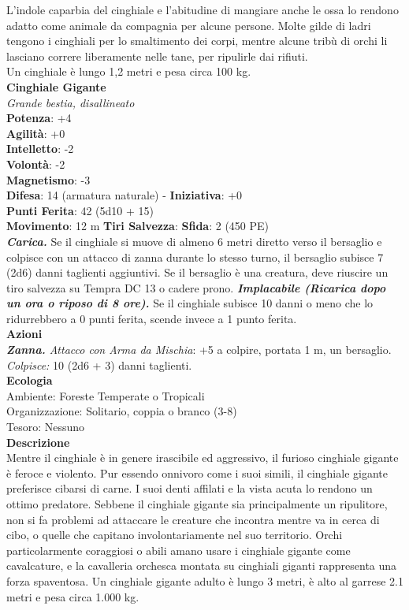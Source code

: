 \begin{multicols}{2}
L'indole caparbia del cinghiale e l'abitudine di mangiare anche le ossa lo rendono adatto come animale da compagnia per alcune persone. Molte gilde di ladri tengono i cinghiali per lo smaltimento dei corpi, mentre alcune tribù di orchi li lasciano correre liberamente nelle tane, per ripulirle dai rifiuti.\\

Un cinghiale è lungo 1,2 metri e pesa circa 100 kg.\\


\medskip\textbf{Cinghiale Gigante}\\
\emph{Grande bestia, disallineato}\\
\textbf{Potenza}: +4\\
\textbf{Agilità}: +0\\
\textbf{Intelletto}: -2\\
\textbf{Volontà}: -2\\
\textbf{Magnetismo}: -3\\
\textbf{Difesa}: 14 (armatura naturale) - \textbf{Iniziativa}: +0\\
\textbf{Punti Ferita}: 42 (5d10 + 15)\\
\textbf{Movimento}: 12 m
\textbf{Tiri Salvezza}:
\textbf{Sfida}: 2 (450 PE)\smallskip\\
\emph{\textbf{Carica.}} Se il cinghiale si muove di almeno 6 metri diretto verso il bersaglio e colpisce con un attacco di zanna durante lo stesso turno, il bersaglio subisce 7 (2d6) danni taglienti aggiuntivi. Se il bersaglio è una creatura, deve riuscire un tiro salvezza su Tempra DC 13 o cadere prono.
\emph{\textbf{Implacabile (Ricarica dopo un ora o riposo di 8 ore).}} Se il cinghiale subisce 10 danni o meno che lo ridurrebbero a 0 punti ferita, scende invece a 1 punto ferita.\\
\smallskip\textbf{Azioni}\\
\emph{\textbf{Zanna.} Attacco con Arma da Mischia}: +5 a colpire, portata 1 m, un bersaglio.\\
\emph{Colpisce:} 10 (2d6 + 3) danni taglienti.\\
\textbf{Ecologia}\\
Ambiente: Foreste Temperate o Tropicali\\
Organizzazione: Solitario, coppia o branco (3-8)\\
Tesoro: Nessuno\\
\textbf{Descrizione}\\

Mentre il cinghiale è in genere irascibile ed aggressivo, il furioso cinghiale gigante è feroce e violento. Pur essendo onnivoro come i suoi simili, il cinghiale gigante preferisce cibarsi di carne. I suoi denti affilati e la vista acuta lo rendono un ottimo predatore. Sebbene il cinghiale gigante sia principalmente un ripulitore, non si fa problemi ad attaccare le creature che incontra mentre va in cerca di cibo, o quelle che capitano involontariamente nel suo territorio. Orchi particolarmente coraggiosi o abili amano usare i cinghiale gigante come cavalcature, e la cavalleria orchesca montata su cinghiali giganti rappresenta una forza spaventosa. Un cinghiale gigante adulto è lungo 3 metri, è alto al garrese 2.1 metri e pesa circa 1.000 kg.



\end{multicols}
